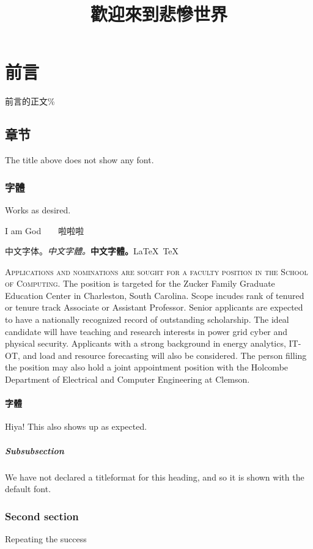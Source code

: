 \documentclass[12pt, UTF8]{ctexart}
\title{歡迎來到悲慘世界}
\newcommand{\IMG}{I am God}
\begin{document}

\begin{titlepage}
	
	\vspace{0.2cm}
	\begin{center}
		{\huge {}}
		
	\end{center}

\end{titlepage}

\part{前言}

前言的正文\%

\chapter{章节}

The title above does not show any font.

\section{字體}

\sffamily
Works as desired. 

\normalfont

\IMG\ \ \ \  啦啦啦

\rmfamily 
中文字体。\textsl{中文字體。}\textbf{中文字體。}\LaTeX\ \TeX

\textsc{Applications and nominations are sought for a faculty position in the School of Computing.} The position is targeted for the Zucker Family Graduate Education Center in Charleston, South Carolina. Scope incudes rank of tenured or tenure track Associate or Assistant Professor. Senior applicants are expected to have a nationally recognized record of outstanding scholarship. The ideal candidate will have teaching and research interests in power grid cyber and physical security. Applicants with a strong background in energy analytics, IT-OT, and load and resource forecasting will also be considered. The person filling the position may also hold a joint appointment position with the Holcombe Department of Electrical and Computer Engineering at Clemson.

\subsection{字體}

Hiya! This also shows up as expected.

\subsubsection{Subsubsection}

We have not declared a titleformat for this heading, and so it is shown with the default font.

\section{Second section}

Repeating the success
\end{document}
